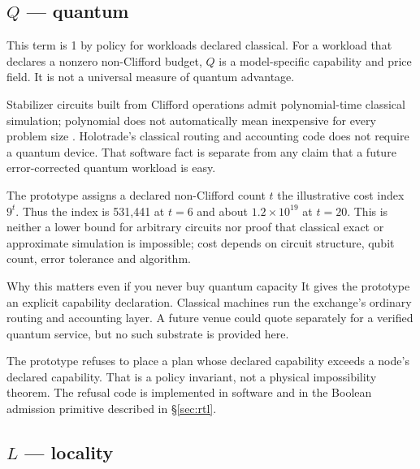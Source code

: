 \documentclass[11pt,letterpaper]{article}
\newcommand{\tagbox}[3]{\tikz[baseline=(X.base)]{\node[inner xsep=3.5pt,inner ysep=1.4pt,rounded corners=1.6pt,fill=#1,text=#2,font=\bfseries\sffamily\tiny] (X) {#3};}}
\newcommand{\MODELLED}{\tagbox{amberlite}{amber!55!black}{MODELLED}}
\newcommand{\PUBLISHED}{\tagbox{greylite}{grey}{PUBLISHED}}
\begin{document}
\subsection{$Q$ --- quantum}

\begin{plainbox}[]
This term is 1 by policy for workloads declared classical. For a workload that
declares a nonzero non-Clifford budget, $Q$ is a model-specific capability and
price field. It is not a universal measure of quantum advantage.
\end{plainbox}

Stabilizer circuits built from Clifford operations admit polynomial-time
classical simulation; polynomial does not automatically mean inexpensive for
every problem size \cite{aaronson2004stabilizer}. \PUBLISHED{} Holotrade's
classical routing and accounting code does not require a quantum device. That
software fact is separate from any claim that a future error-corrected quantum
workload is easy.

The prototype assigns a declared non-Clifford count $t$ the illustrative cost
index $9^t$. \MODELLED{} Thus the index is 531{,}441 at $t=6$ and about
$1.2\times10^{19}$ at $t=20$. This is neither a lower bound for arbitrary
circuits nor proof that classical exact or approximate simulation is impossible;
cost depends on circuit structure, qubit count, error tolerance and algorithm.

\begin{keybox}{Why this matters even if you never buy quantum capacity}
It gives the prototype an explicit capability declaration. Classical machines
run the exchange's ordinary routing and accounting layer. A future venue could
quote separately for a verified quantum service, but no such substrate is
provided here.

\vspace{5pt}
The prototype refuses to place a plan whose declared capability exceeds a
node's declared capability. That is a policy invariant, not a physical
impossibility theorem. The refusal code is implemented in software and in the
Boolean admission primitive described in \S\ref{sec:rtl}.
\end{keybox}

\subsection{$L$ --- locality}
\end{document}
